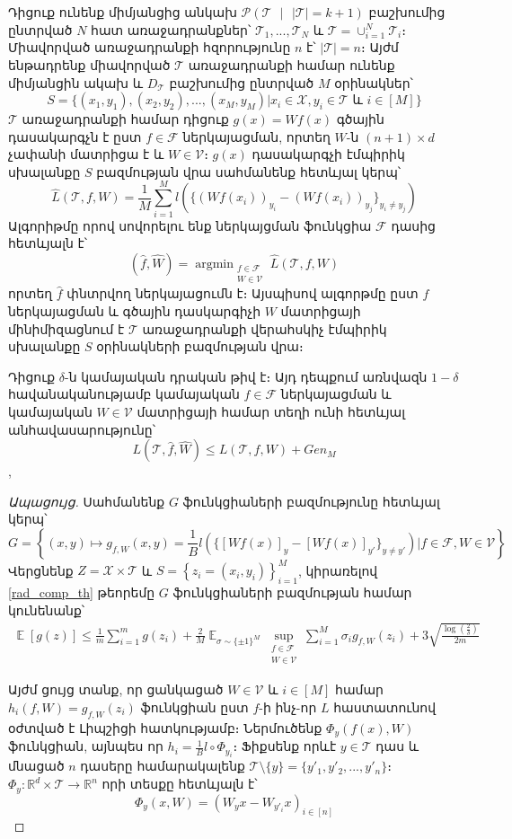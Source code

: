 \documentclass[11pt]{article}
\DeclareMathOperator*{\argmin}{argmin}
\DeclareMathOperator*{\E}{\mathbb{E}}
\begin{document}
Դիցուք ունենք միմյանցից անկախ $\mathcal{P}(\mathcal{T} \text{ } |\text{ }  |\mathcal{T}| = k +1)$ բաշխումից ընտրված $N$ հատ առաջադրանքներ՝ $\mathcal{T}_1, ..., \mathcal{T}_N$  և $\mathcal{T} = \cup_{i=1}^N{\mathcal{T}_i}$։ Միավորված առաջադրանքի հզորությունը $n$ է՝  $|\mathcal{T}| =n $։ Այժմ ենթադրենք միավորված $\mathcal{T}$ առաջադրանքի համար ունենք միմյանցին ակախ և $D_{\mathcal{T}}$ բաշխումից ընտրված $M$ օրինակներ՝
$$S = \{(x_1, y_1), (x_2, y_2), ..., (x_M, y_M) | x_i \in \mathcal{X}, y_i \in \mathcal{T} \text{ և } i \in [M] \}$$
$\mathcal{T}$   առաջադրանքի համար դիցուք $g(x) = Wf(x)$ գծային դասակարգչն է ըստ $f \in \mathcal{F}$ ներկայացման, որտեղ $W$-ն $(n+1) \times d$ չափանի մատրիցա է և $W \in \mathcal{V}$։ $g(x)$ դասակարգչի էմպիրիկ սխալանքը $S$ բազմության վրա սահմանենք հետևյալ կերպ՝
$$\hat{L}(\mathcal{T},f, W) = \frac{1}{M}\sum_{i=1}^Ml(\{(Wf(x_i))_{y_i} - (Wf(x_i))_{y_j}\}_{y_i \neq y_j})$$ 
Ալգորիթմը որով սովորելու ենք ներկայցման ֆունկցիա $\mathcal{F}$ դասից հետևյալն է՝
$$(\hat{f}, \hat{W}) = \argmin_{\substack{f \in \mathcal{F} \\ W \in \mathcal{V}}} \hat{L}(\mathcal{T},f, W)$$
որտեղ $\hat{f}$ փնտրվող ներկայացումն է։ Այսպիսով ալգորթմը ըստ $f$ ներկայացման և գծային դասկարգիչի $W$ մատրիցայի  մինիմիզացնում է $\mathcal{T}$ առաջադրանքի վերահսկիչ էմպիրիկ սխալանքը $S$ օրինակների բազմության վրա։

\begin{lemma}
Դիցուք $\delta$-ն կամայական դրական թիվ է։ Այդ դեպքում առնվազն $1-\delta$ հավանականությամբ կամայական $f \in \mathcal{F}$ ներկայացման և կամայական $W \in \mathcal{V}$ մատրիցայի համար տեղի ունի հետևյալ անհավասարությունը՝
$$L(\mathcal{T}, \hat{f}, \hat{W}) \leq L(\mathcal{T}, f, W) + Gen_M$$,
\end{lemma}
\begin{proof}[Ապացույց]
 Սահմանենք $G$ ֆունկցիաների բազմությունը հետևյալ կերպ՝
$$G = \left \{ (x, y) \mapsto  g_{f, W}(x, y) = \frac{1}{B}l(\{[Wf(x)]_y - [Wf(x)]_{y'}\}_{y\neq y'}   ) | f \in \mathcal{F}, W \in \mathcal{V} \right \}$$
Վերցնենք $Z = \mathcal{X} \times \mathcal{T}$ և $S = \left \{z_i = (x_i, y_i) \right \}_{i=1}^M$, կիրառելով \ref{rad_comp_th} թեորեմը $G$ ֆունկցիաների բազմության համար կունենանք՝
\begin{align*}
\E[g(z)] \leq \frac{1}{m}\sum_{i=1}^mg(z_i) + \frac{2}{M}\E_{\sigma \sim \{\pm1\}^M} \sup_{\substack{ f  \in \mathcal{F}  \\ W \in \mathcal{V}}}\sum_{i=1}^M \sigma_ig_{f,W}(z_i) +    3\sqrt{\frac{\log \left( \frac{2}{\delta} \right)}{2m}}
\end{align*}

Այժմ ցույց տանք, որ ցանկացած $W \in \mathcal{V}$  և $i \in [M]$ համար $h_i(f, W) = g_{f,W}(z_i)$ ֆունկցիան ըստ $f$-ի ինչ-որ $L$ հաստատունով օժտված է Լիպշիցի հատկությամբ։ Ներմուծենք $\Phi_y(f(x), W)$ ֆունկցիան, այնպես որ $h_i = \frac{1}{B} l \circ \Phi_{y_i}$։ Ֆիքսենք որևէ $y \in \mathcal{T}$ դաս և մնացած $n$ դասերը համարակալենք  $\mathcal{T} \setminus \{y\} =\{y'_1, y'_2, ..., y'_n\} $։ $\Phi_y : \mathbb{R}^d \times \mathcal{T} \rightarrow \mathbb{R}^n$ որի տեսքը հետևյալն է՝
$$\Phi_y(x, W) = (W_yx-W_{y'_{i}}x)_{i \in [n]}$$
\end{proof}
\iffalse
\end{document}
